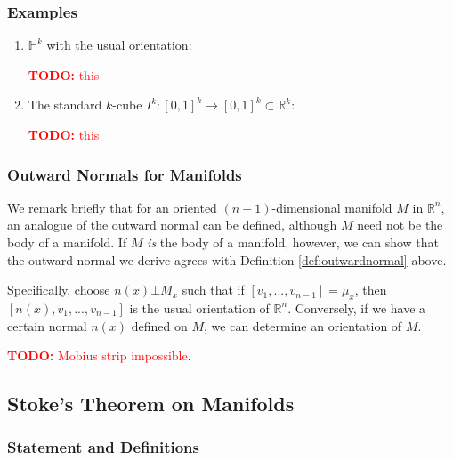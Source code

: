 \documentclass{article}
\newcommand{\reals}[0]{\mathbb{R}}
\newcommand{\hlfspc}[0]{\mathbb{H}}
\newcommand{\TODO}[1]{\textcolor{red}{\textbf{TODO:} #1}}
\begin{document}
\subsubsection{Examples}

\begin{enumerate}

  \item \(\hlfspc^k\) with the usual orientation:

  \TODO{this}

  \item The standard \(k\)-cube \(I^k: [0, 1]^k \to [0, 1]^k \subset \reals^k\):

  \TODO{this}

\end{enumerate}

\subsubsection{Outward Normals for Manifolds}

We remark briefly that for an oriented \((n - 1)\)-dimensional manifold \(M\) in \(\reals^n\), an analogue of the outward normal can be defined, although \(M\) need not be the body of a manifold. If \(M\) \textit{is} the body of a manifold, however, we can show that the outward normal we derive agrees with Definition \ref{def:outwardnormal} above.

Specifically, choose \(n(x) \bot M_x\) such that if \([v_1,...,v_{n - 1}] = \mu_x\), then \([n(x), v_1,...,v_{n - 1}]\) is the usual orientation of \(\reals^n\).
Conversely, if we have a certain normal \(n(x)\) defined on \(M\), we can determine an orientation of \(M\).

\TODO{Mobius strip impossible}.

\subsection{Stoke's Theorem on Manifolds}

\subsubsection{Statement and Definitions}
\end{document}
